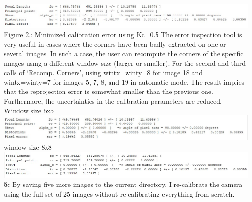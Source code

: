 \documentclass[a4paper, 12pt]{report}
\begin{document}
\includegraphics[width=1.2\textwidth]{resources/image/im6_k.5.jpg} \newline
Figure 2.: Minimized calibration error using Kc=0.5 \newline \newline 
The error inspection tool is very useful in cases where the corners have been badly extracted on one or several images. In such a case, the user can recompute the corners of the specific images using a different window size (larger or smaller). \newline 
For the second and third calls of ‘Recomp. Corners’, using wintx=winty=8 for image 18 and wintx=winty=7 for images 5, 7, 8, and 19 in automatic mode. The result implies that the reprojection error is somewhat smaller than the previous one. Furthermore, the uncertainties in the calibration parameters are reduced. \newline 
Window size 5x5 \newline 
\includegraphics[width=1.2\textwidth]{resources/image/im81n.jpg}
\newline
window size 8x8 \newline
\includegraphics[width=1.2\textwidth]{resources/image/im8_w8.jpg} \newline
\textbf{5:} By saving five more images to the current directory. I re-calibrate the camera using the full set of 25 images without re-calibrating everything from scratch. \newline 
\end{document}
